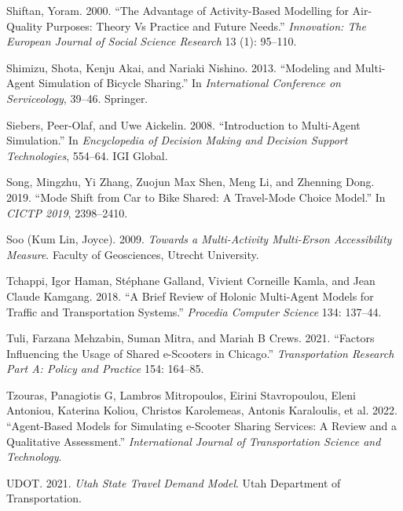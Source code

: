 \documentclass[12pt, oneside, openright]{byuthesis}
\newlength{\cslhangindent}
\newlength{\cslentryspacingunit} %
\newenvironment{CSLReferences}[2] %
 {%
  \setlength{\parindent}{0pt}
  \ifodd #1
  \let\oldpar\par
  \def\par{\hangindent=\cslhangindent\oldpar}
  \fi
  \setlength{\parskip}{#2\cslentryspacingunit}
 }%
 {}
\begin{document}
\begin{CSLReferences}{1}{0}
\leavevmode{}%
Shiftan, Yoram. 2000. {``The Advantage of Activity-Based Modelling for Air-Quality Purposes: Theory Vs Practice and Future Needs.''} \emph{Innovation: The European Journal of Social Science Research} 13 (1): 95--110.

\leavevmode{}%
Shimizu, Shota, Kenju Akai, and Nariaki Nishino. 2013. {``Modeling and Multi-Agent Simulation of Bicycle Sharing.''} In \emph{International Conference on Serviceology}, 39--46. Springer.

\leavevmode{}%
Siebers, Peer-Olaf, and Uwe Aickelin. 2008. {``Introduction to Multi-Agent Simulation.''} In \emph{Encyclopedia of Decision Making and Decision Support Technologies}, 554--64. IGI Global.

\leavevmode{}%
Song, Mingzhu, Yi Zhang, Zuojun Max Shen, Meng Li, and Zhenning Dong. 2019. {``Mode Shift from Car to Bike Shared: A Travel-Mode Choice Model.''} In \emph{CICTP 2019}, 2398--2410.

\leavevmode{}%
Soo (Kum Lin, Joyce). 2009. \emph{Towards a Multi-Activity Multi-Erson Accessibility Measure}. Faculty of Geosciences, Utrecht University.

\leavevmode{}%
Tchappi, Igor Haman, Stéphane Galland, Vivient Corneille Kamla, and Jean Claude Kamgang. 2018. {``A Brief Review of Holonic Multi-Agent Models for Traffic and Transportation Systems.''} \emph{Procedia Computer Science} 134: 137--44.

\leavevmode{}%
Tuli, Farzana Mehzabin, Suman Mitra, and Mariah B Crews. 2021. {``Factors Influencing the Usage of Shared e-Scooters in Chicago.''} \emph{Transportation Research Part A: Policy and Practice} 154: 164--85.

\leavevmode{}%
Tzouras, Panagiotis G, Lambros Mitropoulos, Eirini Stavropoulou, Eleni Antoniou, Katerina Koliou, Christos Karolemeas, Antonis Karaloulis, et al. 2022. {``Agent-Based Models for Simulating e-Scooter Sharing Services: A Review and a Qualitative Assessment.''} \emph{International Journal of Transportation Science and Technology}.

\leavevmode{}%
UDOT. 2021. \emph{Utah State Travel Demand Model}. Utah Department of Transportation.


\end{CSLReferences}
\end{document}
